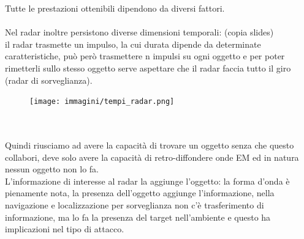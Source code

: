 \documentclass[oneside, 12pt]{extbook}
\begin{document}
Tutte le prestazioni ottenibili dipendono da diversi fattori.\\\\
Nel radar inoltre persistono diverse dimensioni temporali: (copia slides)\\
il radar trasmette un impulso, la cui durata dipende da determinate caratteristiche, può però trasmettere n impulsi su ogni oggetto e per poter rimetterli sullo stesso oggetto serve aspettare che il radar faccia tutto il giro (radar di sorveglianza).\\
\begin{figure}[!h]
	\texttt{[image: immagini/tempi\_radar.png]}
\end{figure}\\\\
Quindi riusciamo ad avere la capacità di trovare un oggetto senza che questo collabori, deve solo avere la capacità di retro-diffondere onde EM ed in natura nessun oggetto non lo fa.\\
L'informazione di interesse al radar la aggiunge l'oggetto: la forma d'onda è pienamente nota, la presenza dell'oggetto aggiunge l'informazione, nella navigazione e localizzazione per sorveglianza non c'è trasferimento di informazione, ma lo fa la presenza del target nell'ambiente e questo ha implicazioni nel tipo di attacco.\\
\end{document}
